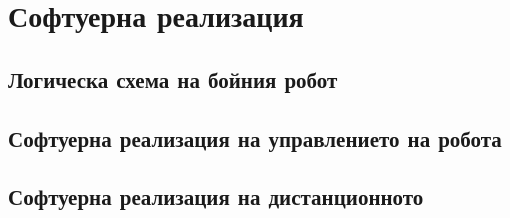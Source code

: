 \chapter{Софтуерна реализация}

\section{Логическа схема на бойния робот}

\section{Софтуерна реализация на управлението на робота}

\section{Софтуерна реализация на дистанционното}
